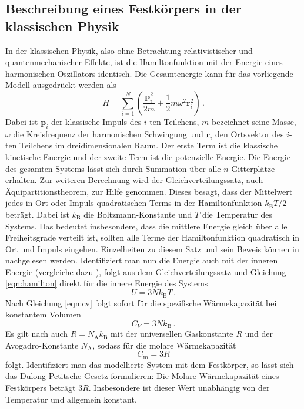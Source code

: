 \subsection{Beschreibung eines Festkörpers in der klassischen Physik}
In der klassischen Physik, also ohne Betrachtung relativistischer und quantenmechanischer
Effekte, ist die Hamiltonfunktion mit der Energie eines harmonischen
Oszillators identisch. Die Gesamtenergie kann für das vorliegende Modell ausgedrückt werden als
\begin{equation}
  H = \sum_{i=1}^N \left(\frac{\symbf{p}_i^2}{2 m} + \frac{1}{2} m \omega^2 \symbf{r}_i^2\right)\,.
  \label{eqn:hamilton}
\end{equation}
Dabei ist $\symbf{p}_i$ der klassische Impuls des $i$-ten Teilchens,
$m$ bezeichnet seine Masse, $\omega$ die Kreisfrequenz der harmonischen Schwingung und $\symbf{r}_i$
den Ortsvektor des $i$-ten Teilchens im dreidimensionalen Raum. Der erste Term ist die klassische kinetische
Energie und der zweite Term ist die potenzielle Energie. Die Energie des gesamten
Systems lässt sich durch Summation über alle $n$ Gitterplätze erhalten.\newline
Zur weiteren Berechnung wird der Gleichverteilungssatz, auch
Äquipartitionstheorem, zur Hilfe genommen.
Dieses besagt, dass der Mittelwert jedes in Ort oder Impuls quadratischen Terms
in der Hamiltonfunktion $k_\text{B} T / 2$ beträgt.
Dabei ist $k_\text{B}$ die Boltzmann-Konstante und $T$ die Temperatur des Systems.
Das bedeutet insbesondere, dass die mittlere Energie gleich über alle
Freiheitsgrade verteilt ist, sollten alle Terme der Hamiltonfunktion quadratisch
in Ort und Impuls eingehen. Einzelheiten zu diesem Satz und sein Beweis können
in \cite{Gleichverteilungssatz} nachgelesen werden.\newline
Identifiziert man nun die Energie auch mit der inneren Energie (vergleiche dazu \cite{failure}), folgt aus dem Gleichverteilungssatz
und Gleichung \eqref{eqn:hamilton} direkt für die innere Energie des Systems
\begin{equation}
  U = 3 N k_\text{B} T\,.
  \label{eqn:usolid}
\end{equation}
Nach Gleichung \eqref{eqn:cv} folgt sofort für die spezifische Wärmekapazität
bei konstantem Volumen
\begin{equation}
  C_V = 3 N k_\text{B}\,.
  \label{eqn:cvsolid}
\end{equation}
Es gilt nach \cite{failure} auch $R = N_\text{A} k_\text{B}$ mit der universellen Gaskonstante $R$ und der
Avogadro-Konstante $N_\text{A}$, sodass für die molare Wärmekapazität
\begin{equation}
  C_\text{m} = 3 R
  \label{eqn:dulongpetit}
\end{equation}
folgt. Identifiziert man das modellierte System mit dem Festkörper, so lässt sich
das Dulong-Petitsche Gesetz formulieren: \newline
Die Molare Wärmekapazität eines Festkörpers beträgt $3 R$. Insbesondere ist dieser
Wert unabhängig von der Temperatur und allgemein konstant.
